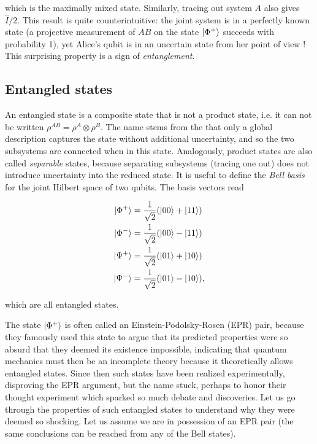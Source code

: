 \noindent which is the maximally mixed state. Similarly, tracing out system $A$ also gives $\hat{I}/2$. This result is quite counterintuitive: the joint system is in a perfectly known state (a projective measurement of $AB$ on the state $\ket{\Phi^+}$ succeeds with probability 1), yet Alice's qubit is in an uncertain state from her point of view ! This surprising property is a sign of \textit{entanglement}.

\subsection{Entangled states}

An entangled state is a composite state that is not a product state, i.e. it can not be written $\rho^{AB} = \rho^A \otimes \rho^B$. The name stems from the that only a global description captures the state without additional uncertainty, and so the two subsystems are connected when in this state. Analogously, product states are also called \textit{separable} states, because separating subsystems (tracing one out) does not introduce uncertainty into the reduced state. It is useful to define the \textit{Bell basis} for the joint Hilbert space of two qubits. The basis vectors read

\begin{align}
    \ket{\Phi^+} &= \frac{1}{\sqrt{2}} (\ket{00} + \ket{11})\\
    \ket{\Phi^-} &= \frac{1}{\sqrt{2}} (\ket{00} - \ket{11})\\
    \ket{\Psi^+} &= \frac{1}{\sqrt{2}} (\ket{01} + \ket{10})\\
    \ket{\Psi^-} &= \frac{1}{\sqrt{2}} (\ket{01} - \ket{10}),
\end{align}

\noindent which are all entangled states. 

The state $\ket{\Phi^+}$ is often called an Einstein-Podolsky-Rosen (EPR) pair, because they famously used this state to argue that its predicted properties were so absurd that they deemed its existence impossible, indicating that quantum mechanics must then be an incomplete theory because it theoretically allows entangled states. Since then such states have been realized experimentally, disproving the EPR argument, but the name stuck, perhaps to honor their thought experiment which sparked so much debate and discoveries. Let us go through the properties of such entangled states to understand why they were deemed so shocking. Let us assume we are in possession of an EPR pair (the same conclusions can be reached from any of the Bell states).

